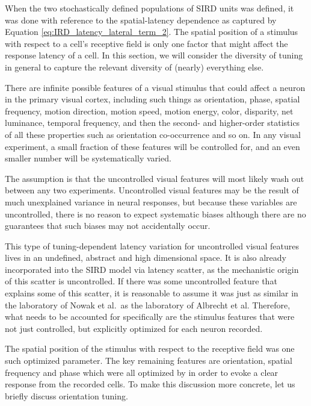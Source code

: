 \documentclass[phd,ianc,twoside]{infthesis}
\begin{document}
When the two stochastically defined populations of SIRD units was
defined, it was done with reference to the spatial-latency dependence as
captured by Equation \ref{eq:IRD_latency_lateral_term_2}. The spatial
position of a stimulus with respect to a cell's receptive field is only
one factor that might affect the response latency of a cell. In this
section, we will consider the diversity of tuning in general to capture
the relevant diversity of (nearly) everything else.

There are infinite possible features of a visual stimulus that could
affect a neuron in the primary visual cortex, including such things as
orientation, phase, spatial frequency, motion direction, motion speed,
motion energy, color, disparity, net luminance, temporal frequency, and
then the second- and higher-order statistics of all these properties
such as orientation co-occurrence and so on. In any visual experiment, a
small fraction of these features will be controlled for, and an even
smaller number will be systematically varied.

The assumption is that the uncontrolled visual features will most likely
wash out between any two experiments. Uncontrolled visual features may
be the result of much unexplained variance in neural responses, but
because these variables are uncontrolled, there is no reason to expect
systematic biases although there are no guarantees that such biases may
not accidentally occur.

This type of tuning-dependent latency variation for uncontrolled visual
features lives in an undefined, abstract and high dimensional space. It
is also already incorporated into the SIRD model via latency scatter, as
the mechanistic origin of this scatter is uncontrolled. If there was
some uncontrolled feature that explains some of this scatter, it is
reasonable to assume it was just as similar in the laboratory of Nowak
et al.\ as the laboratory of Albrecht et al. Therefore, what needs to be
accounted for specifically are the stimulus features that were not
just controlled, but explicitly optimized for each neuron recorded.

The spatial position of the stimulus with respect to the receptive field
was one such optimized parameter. The key remaining features are
orientation, spatial frequency and phase which were all optimized by
\citet{albrecht_jneurophys02} in order to evoke a clear response
from the recorded cells. To make this discussion more concrete, let us
briefly discuss orientation tuning.
\end{document}
